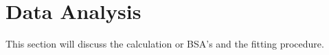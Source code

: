 \section{Data Analysis}
This section will discuss the calculation or BSA's and the fitting procedure.  